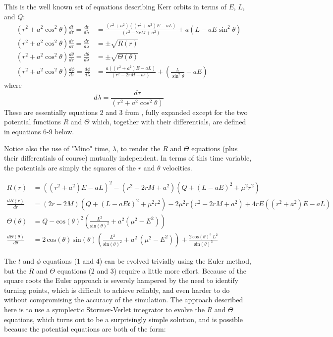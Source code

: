 \documentclass[11pt]{article}
\begin{document}
This is the well known set of equations describing Kerr orbits in terms of $E$, $L$, and $Q$:
\begin{align}
(r^2 + a^2 \cos^2\theta) \frac{d t}{d \tau} = \frac{d t}{d \lambda} &= \frac{(r^2 + a^2) ((r^2 + a^2) E - aL)} {({r}^{2} - 2rM  + {a}^{2})} + a(L - aE \sin^2 \theta) \\
(r^2 + a^2 \cos^2\theta) \frac{d r}{d \tau} = \frac{d r}{d \lambda} &= \pm \sqrt {R(r)} \\
(r^2 + a^2 \cos^2\theta) \frac{d \theta}{d \tau} = \frac{d \theta}{d \lambda} &= \pm \sqrt {\Theta (\theta)} \\
(r^2 + a^2 \cos^2\theta) \frac{d \phi}{d \tau} = \frac{d \phi}{d \lambda} &= \frac{a ((r^2 + a^2) E - aL)} {({r}^{2} - 2rM  + {a}^{2})} + (\frac {L} {\sin^2 \theta} -aE)
\end{align}
where
\begin{equation}
d \lambda = \frac {d \tau} {(r^2 + a^2 \cos^2\theta)}
\end{equation}
These are essentially equations 2 and 3 from \cite{wilkins}, fully expanded except for the two potential functions $R$ and $\Theta$ which, together with their differentials, are defined in equations 6-9 below.

Notice also the use of "Mino" time, $\lambda$, to render the $R$ and $\Theta$ equations (plus their differentials of course) mutually independent.  In terms of this time variable, the potentials are simply the squares of the $r$ and $\theta$ velocities.

\begin{align}
R(r) &= ((r^2 + a^2) E - aL)^2 - (r^2 - 2rM  + a^{2}) (Q + {( L - aE) }^{2}+{\mu}^{2}{r}^{2}) \\
\frac{d R(r)}{d r} &= (2r - 2M) (Q + {( L - aEt) }^{2} + {\mu}^{2}{r}^{2}) - 2{\mu}^{2}r({r}^{2} - 2rM  + {a}^{2}) +4rE ( ( {r}^{2}+{a}^{2}) E - aL) \\
\Theta (\theta) &= Q - {\mathrm{cos}( \theta) }^{2}( \frac{{L}^{2}}{{\mathrm{sin}( \theta) }^{2}}+{a}^{2}( {\mu}^{2} - {E}^{2}) ) \\
\frac{d \Theta (\theta)}{d \theta} &= 2\,\mathrm{cos}\left( \theta\right) \,\mathrm{sin}\left( \theta\right) \left( \frac{{L}^{2}}{{\mathrm{sin}\left( \theta\right) }^{2}}+{a}^{2}\,\left( {\mu}^{2} - {E}^{2}\right) \right) +\frac{2\,{\mathrm{cos}\left( \theta\right) }^{3}\,{L}^{2}}{{\mathrm{sin}\left( \theta\right) }^{3}}
\end{align}

The $t$ and $\phi$ equations (1 and 4) can be evolved trivially using the Euler method, but the $R$ and $\Theta$ equations (2 and 3) require a little more effort.  Because of the square roots the Euler approach is severely hampered by the need to identify turning points, which is difficult to achieve reliably, and even harder to do without compromising the accuracy of the simulation.  The approach described here is to use a symplectic Stormer-Verlet integrator \cite{hairer} to evolve the $R$ and $\Theta$ equations, which turns out to be a surprisingly simple solution, and is possible because the potential equations are both of the form:
\end{document}
